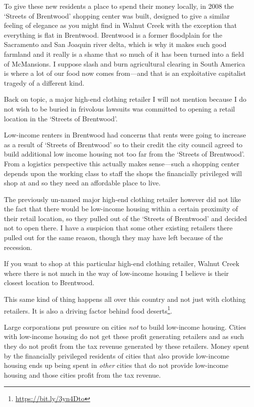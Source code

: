 To give these new residents a place to spend their money locally, in 2008 the `Streets of Brentwood' shopping center was built, designed to give a similar feeling of elegance as you might find in Walnut Creek with the exception that everything is flat in Brentwood. Brentwood is a former floodplain for the Sacramento and San Joaquin river delta, which is why it makes such good farmland and it really is a shame that so much of it has been turned into a field of McMansions. I suppose slash and burn agricultural clearing in South America is where a lot of our food now comes from---and that is an exploitative capitalist tragedy of a different kind.

Back on topic, a major high-end clothing retailer I will not mention because I do not wish to be buried in frivolous lawsuits was committed to opening a retail location in the `Streets of Brentwood'.

Low-income renters in Brentwood had concerns that rents were going to increase as a result of `Streets of Brentwood' so to their credit the city council agreed to build additional low income housing not too far from the `Streets of Brentwood'. From a logistics perspective this actually makes sense---such a shopping center depends upon the working class to staff the shops the financially privileged will shop at and so they need an affordable place to live.

The previously un-named major high-end clothing retailer however did not like the fact that there would be low-income housing within a certain proximity of their retail location, so they pulled out of the `Streets of Brentwood' and decided not to open there. I have a suspicion that some other existing retailers there pulled out for the same reason, though they may have left because of the recession.

If you want to shop at this particular high-end clothing retailer, Walnut Creek where there is not much in the way of low-income housing I believe is their closest location to Brentwood.

This same kind of thing happens all over this country and not just with clothing retailers. It is also a driving factor behind food deserts\footnote{\url{https://bit.ly/3yn4Dto}}.

Large corporations put pressure on cities \emph{not} to build low-income housing. Cities with low-income housing do not get these profit generating retailers and as such they do not profit from the tax revenue generated by these retailers. Money spent by the financially privileged residents of cities that also provide low-income housing ends up being spent in \emph{other} cities that do not provide low-income housing and those cities profit from the tax revenue.

